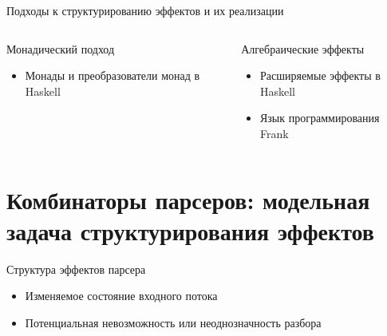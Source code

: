 \begin{frame}[fragile]{Подходы к структурированию эффектов и их реализации}

\begin{columns}
\begin{column}{0.49\textwidth}
  \begin{block}{Монадический подход}
    \begin{itemize}
      \item Монады и преобразователи монад в Haskell
    \end{itemize}
    \vspace{0.01em}
  \end{block}
\end{column}
\begin{column}{0.49\textwidth}
  \begin{block}{Алгебраические эффекты}
    \begin{itemize}
      \item Расширяемые эффекты в Haskell
      \item Язык программирования Frank
    \end{itemize}
  \end{block}
\end{column}
\end{columns}
\end{frame}

\section{Комбинаторы парсеров: модельная задача структурирования эффектов}

\begin{frame}[fragile]{Структура эффектов парсера}
\begin{itemize}
  \item Изменяемое состояние входного потока
  \item Потенциальная невозможность или неоднозначность разбора
\end{itemize}
\end{frame}

